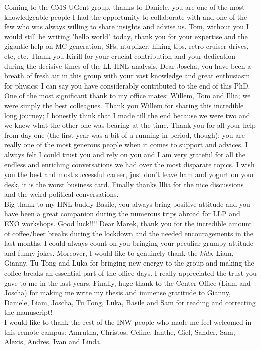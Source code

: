 \begin{acknowledgements}
{Coming to the CMS UGent group, thanks to Daniele, you are one of the most knowledgeable people I had the opportunity to collaborate with and one of the few who was always willing to share insights and advise us.
Tom, without you I would still be writing "hello world" today, thank you for your expertise and the gigantic help on MC generation, SFs, ntuplizer, hiking tips, retro cruiser drives, etc, etc.
Thank you Kirill for your crucial contribution and your dedication during the decisive times of the LL-HNL analysis. 
Dear Joscha, you have been a breath of fresh air in this group with your vast knowledge and great enthusiasm for physics; I can say you have considerably contributed to the end of this PhD. \\
One of the most significant thank to my office mates: Willem, Tom and Illia; we were simply the best colleagues. Thank you Willem for sharing this incredible long journey; I honestly think that I made till the end because we were two and we knew what the other one was bearing at the time. Thank you for all your help from day one (the first year was a bit of a running-in period, though); you are really one of the most generous people when it comes to support and advices. I always felt I could trust you and rely on you and I am very grateful for all the endless and enriching conversations we had over the most disparate topics. I wish you the best and most successful career, just don't leave ham and yogurt on your desk, it is the worst business card. Finally thanks Illia for the nice discussions and the weird political conversations.\\
Big thank to my HNL buddy Basile, you always bring positive attitude and you have been a great companion during the numerous trips abroad for LLP and EXO workshops. Good luck!!!! Dear Marek, thank you for the incredible amount of coffee/beer breaks during the lockdown and the needed encouragements in the last months. I could always count on you bringing your peculiar grumpy attitude and funny jokes.  
 Moreover, I would like to genuinely thank the \emph{kids}, Liam, Gianny, Tu Tong and Luka for bringing new energy to the group and making the coffee breaks an essential part of the office days. I really appreciated the trust you gave to me in the last years. 
Finally, huge thank to the Center Office (Liam and Joscha) for making me write my thesis and immense gratitude to Gianny, Daniele, Liam, Joscha, Tu Tong, Luka, Basile and Sam for reading and correcting the manuscript! \\
I would like to thank the rest of the INW people who made me feel welcomed in this remote campus: Amrutha, Christos, Celine, Ianthe, Giel, Sander, Sam, Alexis, Andres, Ivan and Linda. \\

}
\end{acknowledgements}
